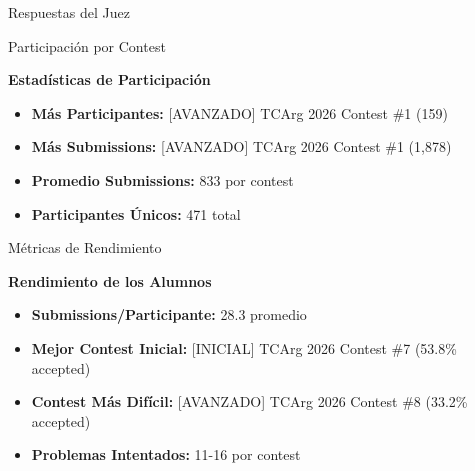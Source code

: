 \documentclass{beamer}
\begin{document}
\begin{frame}{Respuestas del Juez}
\begin{center}

\vspace{0.2cm}

\end{center}
\end{frame}

\begin{frame}{Participación por Contest}
\begin{center}
\Large
\textbf{Estadísticas de Participación}

\vspace{0.6cm}

\large
\begin{itemize}
\item \textbf{Más Participantes:} [AVANZADO] TCArg 2026 Contest \#1 (159)
\item \textbf{Más Submissions:} [AVANZADO] TCArg 2026 Contest \#1 (1,878)
\item \textbf{Promedio Submissions:} 833 por contest
\item \textbf{Participantes Únicos:} 471 total
\end{itemize}
\end{center}
\end{frame}

\begin{frame}{Métricas de Rendimiento}
\begin{center}
\Large
\textbf{Rendimiento de los Alumnos}

\vspace{0.6cm}

\large
\begin{itemize}
\item \textbf{Submissions/Participante:} 28.3 promedio
\item \textbf{Mejor Contest Inicial:} [INICIAL] TCArg 2026 Contest \#7 (53.8\% accepted)
\item \textbf{Contest Más Difícil:} [AVANZADO] TCArg 2026 Contest \#8 (33.2\% accepted)
\item \textbf{Problemas Intentados:} 11-16 por contest
\end{itemize}
\end{center}
\end{frame}
\end{document}

